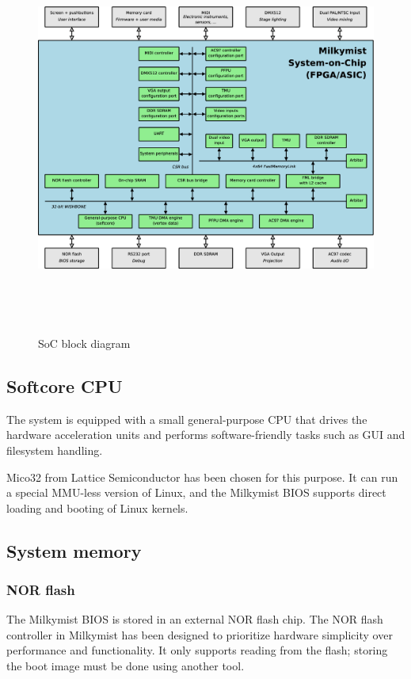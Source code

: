 \documentclass[a4paper,11pt]{article}
\begin{document}
\begin{figure}[H]
\centering
\includegraphics[height=130mm]{soc_architecture.eps}
\caption{SoC block diagram}
\end{figure}

\subsection{Softcore CPU}
The system is equipped with a small general-purpose CPU that drives the hardware acceleration units and performs software-friendly tasks such as GUI and filesystem handling.

Mico32 from Lattice Semiconductor has been chosen for this purpose. It can run a special MMU-less version of Linux, and the Milkymist BIOS supports direct loading and booting of Linux kernels.

\subsection{System memory}
\subsubsection{NOR flash}
The Milkymist BIOS is stored in an external NOR flash chip. The NOR flash controller in Milkymist has been designed to prioritize hardware simplicity over performance and functionality. It only supports reading from the flash; storing the boot image must be done using another tool.
\end{document}
